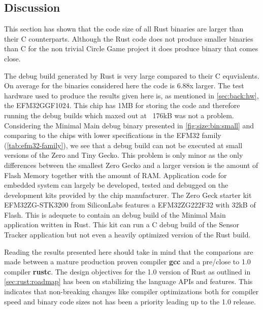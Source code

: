 \subsection{Discussion}

This section has shown that the code size of all Rust binaries are larger than their C counterparts.
Although the Rust code does not produce smaller binaries than C for the non trivial Circle Game project it does produce binary that comes close.

The debug build generated by Rust is very large compared to their C equvialents.
On average for the binaries considered here the code is 6.88x larger.
The test hardware used to produce the results given here is, as mentioned in \autoref{sec:back:hw}, the EFM32GGF1024.
This chip has 1MB for storing the code and therefore running the debug builds which maxed out at ~176kB was not a problem.
Considering the Minimal Main debug binary presented in \autoref{fig:size:bin:small} and comparing to the chips with lower specifications in the EFM32 family (\autoref{tab:efm32-family}), we see that a debug build can not be executed at small versions of the Zero and Tiny Gecko.
This problem is only minor as the only differences between the smallest Zero Gecko and a larger version is the amount of Flash Memory together with the amount of RAM.
Application code for embedded system can largely be developed, tested and debugged on the development kits provided by the chip manufacturer.
The Zero Geck starter kit EFM32ZG-STK3200 from SiliconLabs features a EFM32ZG222F32 with 32kB of Flash.
This is adequete to contain an debug build of the Minimal Main application written in Rust.
This kit can run a C debug build of the Sensor Tracker application but not even a heavily optimized version of the Rust build.

Reading the results presented here should take in mind that the comparions are made between a mature production proven compiler \textbf{gcc} and a pre/close to 1.0 compiler \textbf{rustc}.
The design objectives for the 1.0 version of Rust as outlined in \autoref{sec:rust:roadmap} has been on stabilizing the language APIs and features.
This indicates that non-breaking changes like compiler optimizations both for compiler speed and binary code sizes not has been a priority leading up to the 1.0 release.
